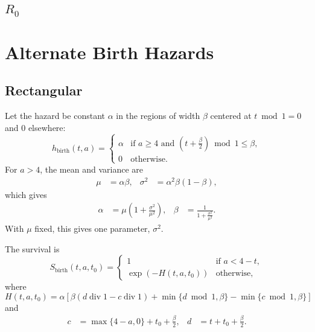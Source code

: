 \documentclass{jpmarticle}
\DeclareMathOperator{\dv}{div}
\begin{document}
\subsection{$R_0$}


\appendix

\section{Alternate Birth Hazards}

\subsection{Rectangular}

Let the hazard be constant $\alpha$ in the regions of width $\beta$
centered at $t \bmod 1 = 0$ and $0$ elsewhere:
\begin{equation}
  h_{\mathrm{birth}} (t, a) =
  \begin{cases}
    \alpha & \text{if $a \geq 4$ and $\left(t + \frac{\beta}{2}\right)
      \bmod 1 \leq \beta$},
    \\
    0 & \text{otherwise}.
  \end{cases}
\end{equation}
For $a > 4$, the mean and variance are
\begin{align}
  \mu &= \alpha \beta,
  &
  \sigma^2 &= \alpha^2 \beta (1 - \beta),
\end{align}
which gives
\begin{align}
  \alpha &= \mu \left(1 + \frac{\sigma^2}{\mu^2}\right),
  &
  \beta &= \frac{1}{1 + \frac{\sigma^2}{\mu^2}}.
\end{align}
With $\mu$ fixed, this gives one parameter, $\sigma^2$.

The survival is
\begin{equation}
  S_{\mathrm{birth}}(t, a, t_0) =
  \begin{cases}
    1 & \text{if $a < 4 - t$},
    \\
    \exp\left(-H(t, a, t_0)\right)
    & \text{otherwise},
  \end{cases}
\end{equation}
where
\begin{equation}
  H(t, a, t_0) =
  \alpha \left[
    \beta (d \dv 1 - c \dv 1)
    + \min\{d \bmod 1, \beta\}
    - \min\{c \bmod 1, \beta\}
  \right]
\end{equation}
and
\begin{align}
  c &= \max\{4 - a, 0\} + t_0 + \frac{\beta}{2},
  &
  d &= t + t_0 + \frac{\beta}{2}.
\end{align}
\end{document}
